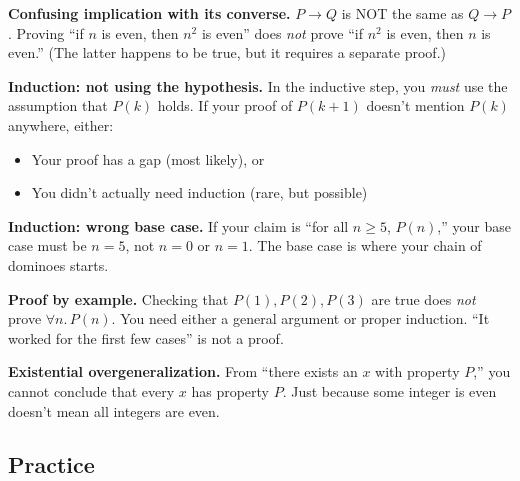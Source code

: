 \begin{commonmistake}
\textbf{Confusing implication with its converse.} $P \to Q$ is NOT the same as $Q \to P$. Proving ``if $n$ is even, then $n^2$ is even'' does \emph{not} prove ``if $n^2$ is even, then $n$ is even.'' (The latter happens to be true, but it requires a separate proof.)
\end{commonmistake}

\begin{commonmistake}
\textbf{Induction: not using the hypothesis.} In the inductive step, you \emph{must} use the assumption that $P(k)$ holds. If your proof of $P(k+1)$ doesn't mention $P(k)$ anywhere, either:
\begin{itemize}
  \item Your proof has a gap (most likely), or
  \item You didn't actually need induction (rare, but possible)
\end{itemize}
\end{commonmistake}

\begin{commonmistake}
\textbf{Induction: wrong base case.} If your claim is ``for all $n \geq 5$, $P(n)$,'' your base case must be $n = 5$, not $n = 0$ or $n = 1$. The base case is where your chain of dominoes starts.
\end{commonmistake}

\begin{commonmistake}
\textbf{Proof by example.} Checking that $P(1), P(2), P(3)$ are true does \emph{not} prove $\forall n.\, P(n)$. You need either a general argument or proper induction. ``It worked for the first few cases'' is not a proof.
\end{commonmistake}

\begin{commonmistake}
\textbf{Existential overgeneralization.} From ``there exists an $x$ with property $P$,'' you cannot conclude that every $x$ has property $P$. Just because some integer is even doesn't mean all integers are even.
\end{commonmistake}

\subsection*{Practice}

